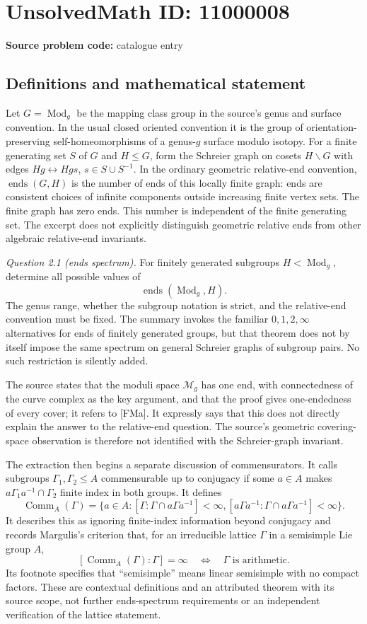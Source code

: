 \documentclass[11pt]{article}
\begin{document}
\section*{UnsolvedMath ID: 11000008}
\textbf{Source problem code:} catalogue entry
\subsection{Definitions and mathematical statement}
Let \(G=\operatorname{Mod}_g\) be the mapping class group in the source's genus and surface convention. In the usual closed oriented convention it is the group of orientation-preserving self-homeomorphisms of a genus-\(g\) surface modulo isotopy. For a finite generating set \(S\) of \(G\) and \(H\leq G\), form the Schreier graph on cosets \(H\backslash G\) with edges \(Hg\leftrightarrow Hgs\), \(s\in S\cup S^{-1}\). In the ordinary geometric relative-end convention, \(\operatorname{ends}(G,H)\) is the number of ends of this locally finite graph: ends are consistent choices of infinite components outside increasing finite vertex sets. The finite graph has zero ends. This number is independent of the finite generating set. The excerpt does not explicitly distinguish geometric relative ends from other algebraic relative-end invariants.

\emph{Question 2.1 (ends spectrum).} For finitely generated subgroups \(H<\operatorname{Mod}_g\), determine all possible values of
\[
 \operatorname{ends}(\operatorname{Mod}_g,H).
\]
The genus range, whether the subgroup notation is strict, and the relative-end convention must be fixed. The summary invokes the familiar \(0,1,2,\infty\) alternatives for ends of finitely generated groups, but that theorem does not by itself impose the same spectrum on general Schreier graphs of subgroup pairs. No such restriction is silently added.

The source states that the moduli space \(\mathcal M_g\) has one end, with connectedness of the curve complex as the key argument, and that the proof gives one-endedness of every cover; it refers to [FMa]. It expressly says that this does not directly explain the answer to the relative-end question. The source's geometric covering-space observation is therefore not identified with the Schreier-graph invariant.

The extraction then begins a separate discussion of commensurators. It calls subgroups \(\Gamma_1,\Gamma_2\leq A\) commensurable up to conjugacy if some \(a\in A\) makes \(a\Gamma_1a^{-1}\cap\Gamma_2\) finite index in both groups. It defines
\[
 \operatorname{Comm}_A(\Gamma)
 =\{a\in A:[\Gamma:\Gamma\cap a\Gamma a^{-1}]<\infty,
 [a\Gamma a^{-1}:\Gamma\cap a\Gamma a^{-1}]<\infty\}.
\]
It describes this as ignoring finite-index information beyond conjugacy and records Margulis's criterion that, for an irreducible lattice \(\Gamma\) in a semisimple Lie group \(A\),
\[
 [\operatorname{Comm}_A(\Gamma):\Gamma]=\infty
 \quad\Longleftrightarrow\quad\Gamma\text{ is arithmetic}.
\]
Its footnote specifies that ``semisimple'' means linear semisimple with no compact factors. These are contextual definitions and an attributed theorem with its source scope, not further ends-spectrum requirements or an independent verification of the lattice statement.
\end{document}
